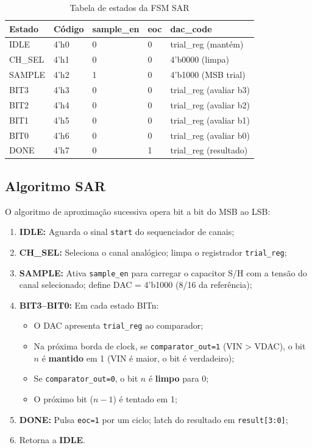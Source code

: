 \documentclass[12pt,a4paper]{article}
\begin{document}
\begin{table}[H]
  \centering
  \caption{Tabela de estados da FSM SAR}
  \label{tab:state_table}
  \begin{tabular}{lllll}
    \toprule
    \textbf{Estado} & \textbf{Código} & \textbf{sample\_en} &
    \textbf{eoc} & \textbf{dac\_code} \\
    \midrule
    IDLE   & 4'h0 & 0 & 0 & trial\_reg (mantém) \\
    CH\_SEL & 4'h1 & 0 & 0 & 4'b0000 (limpa) \\
    SAMPLE & 4'h2 & 1 & 0 & 4'b1000 (MSB trial) \\
    BIT3   & 4'h3 & 0 & 0 & trial\_reg (avaliar b3) \\
    BIT2   & 4'h4 & 0 & 0 & trial\_reg (avaliar b2) \\
    BIT1   & 4'h5 & 0 & 0 & trial\_reg (avaliar b1) \\
    BIT0   & 4'h6 & 0 & 0 & trial\_reg (avaliar b0) \\
    DONE   & 4'h7 & 0 & 1 & trial\_reg (resultado) \\
    \bottomrule
  \end{tabular}
\end{table}

\subsection{Algoritmo SAR}

O algoritmo de aproximação sucessiva opera bit a bit do MSB ao LSB:

\begin{enumerate}
  \item \textbf{IDLE:} Aguarda o sinal \texttt{start} do sequenciador de canais;
  \item \textbf{CH\_SEL:} Seleciona o canal analógico; limpa o registrador \texttt{trial\_reg};
  \item \textbf{SAMPLE:} Ativa \texttt{sample\_en} para carregar o capacitor S/H
        com a tensão do canal selecionado; define DAC = 4'b1000 (8/16 da referência);
  \item \textbf{BIT3--BIT0:} Em cada estado BITn:
    \begin{itemize}
      \item O DAC apresenta \texttt{trial\_reg} ao comparador;
      \item Na próxima borda de clock, se \texttt{comparator\_out=1} (VIN > VDAC),
            o bit $n$ é \textbf{mantido} em 1 (VIN é maior, o bit é verdadeiro);
      \item Se \texttt{comparator\_out=0}, o bit $n$ é \textbf{limpo} para 0;
      \item O próximo bit ($n-1$) é tentado em 1;
    \end{itemize}
  \item \textbf{DONE:} Pulsa \texttt{eoc=1} por um ciclo; latch do resultado
        em \texttt{result[3:0]};
  \item Retorna a \textbf{IDLE}.
\end{enumerate}
\end{document}
